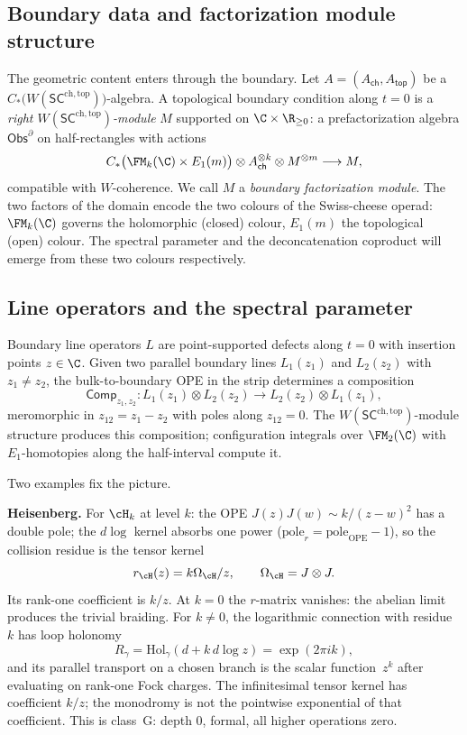 \subsection{Boundary data and factorization module structure}
\label{subsec:boundary-module}
The geometric content enters through the boundary. Let $A=(A_{\mathsf{ch}},A_{\mathsf{top}})$ be a $C_\ast\!\bigl(W(\mathsf{SC}^{\mathrm{ch,top}})\bigr)$-algebra.
A topological boundary condition along $t=0$ is a \emph{right $W(\mathsf{SC}^{\mathrm{ch,top}})$-module} $M$ supported on $\C\times \R_{\ge 0}$: a prefactorization algebra $\mathsf{Obs}^{\partial}$ on half-rectangles with actions
\[
C_\ast\bigl(\FM_k(\C)\times E_1(m)\bigr)\otimes A_{\mathsf{ch}}^{\otimes k}\otimes M^{\otimes m}\longrightarrow M,
\]
compatible with $W$-coherence. We call $M$ a \emph{boundary factorization module}. The two factors of the domain encode the two colours of the Swiss-cheese operad: $\FM_k(\C)$ governs the holomorphic (closed) colour, $E_1(m)$ the topological (open) colour. The spectral parameter and the deconcatenation coproduct will emerge from these two colours respectively.

\subsection{Line operators and the spectral parameter}
\label{subsec:line-ops}
Boundary line operators $L$ are point-supported defects along $t=0$ with insertion points $z\in\C$.
Given two parallel boundary lines $L_1(z_1)$ and $L_2(z_2)$ with $z_1\neq z_2$, the bulk-to-boundary OPE in the strip determines a composition
\[
\mathsf{Comp}_{z_1,z_2} \colon L_1(z_1)\otimes L_2(z_2) \longrightarrow L_2(z_2)\otimes L_1(z_1),
\]
meromorphic in $z_{12}=z_1-z_2$ with poles along $z_{12}=0$.
The $W(\mathsf{SC}^{\mathrm{ch,top}})$-module structure produces this composition; configuration integrals over $\FM_2(\C)$ with $E_1$-homotopies along the half-interval compute it.

Two examples fix the picture.

\medskip
\noindent\textbf{Heisenberg.}
For $\cH_k$ at level $k$: the OPE $J(z)J(w) \sim k/(z-w)^2$ has a double pole; the $d\log$ kernel absorbs one power ($\mathrm{pole}_r = \mathrm{pole}_{\mathrm{OPE}} - 1$), so the collision residue is the tensor kernel
\[
r_{\cH}(z)=k\Omega_{\cH}/z,\qquad \Omega_{\cH}=J\otimes J.
\]
Its rank-one coefficient is $k/z$. At $k=0$ the $r$-matrix vanishes: the abelian limit produces the trivial braiding. For $k\ne 0$, the logarithmic connection with residue~$k$ has loop holonomy
\[
R_\gamma=\mathrm{Hol}_\gamma(d+k\,d\log z)=\exp(2\pi i k),
\]
and its parallel transport on a chosen branch is the scalar
function~$z^k$ after evaluating on rank-one Fock charges. The
infinitesimal tensor kernel has coefficient $k/z$; the monodromy is
not the pointwise exponential of that coefficient. This is class~G:
depth $0$, formal, all higher operations zero.

